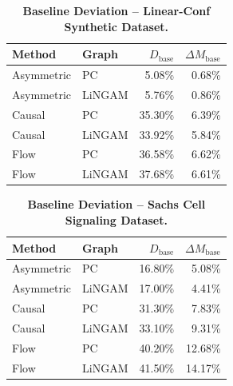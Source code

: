 \documentclass[12pt,a4paper,oneside]{article}
\begin{document}
\begin{table}[H]
  \centering
  \caption{\textbf{Baseline Deviation -- Linear-Conf Synthetic Dataset.}}
  \label{tab:baseline_synth}
  \begin{tabular}{llrr}
    \toprule
    \textbf{Method} & \textbf{Graph} & $D_{\text{base}}$ & $\Delta M_{\text{base}}$ \\
    \midrule
    Asymmetric & PC     & 5.08\%  & 0.68\% \\
    Asymmetric & LiNGAM & 5.76\%  & 0.86\% \\
    Causal     & PC     & 35.30\% & 6.39\% \\
    Causal     & LiNGAM & 33.92\% & 5.84\% \\
    Flow       & PC     & 36.58\% & 6.62\% \\
    Flow       & LiNGAM & 37.68\% & 6.61\% \\
    \bottomrule
  \end{tabular}
\end{table}

\begin{table}[H]
  \centering
  \caption{\textbf{Baseline Deviation -- Sachs Cell Signaling Dataset.}}
  \label{tab:baseline_sachs}
  \begin{tabular}{llrr}
    \toprule
    \textbf{Method} & \textbf{Graph} & $D_{\text{base}}$ & $\Delta M_{\text{base}}$ \\
    \midrule
    Asymmetric & PC     & 16.80\% & 5.08\%  \\
    Asymmetric & LiNGAM & 17.00\% & 4.41\%  \\
    Causal     & PC     & 31.30\% & 7.83\%  \\
    Causal     & LiNGAM & 33.10\% & 9.31\%  \\
    Flow       & PC     & 40.20\% & 12.68\% \\
    Flow       & LiNGAM & 41.50\% & 14.17\% \\
    \bottomrule
  \end{tabular}
\end{table}
\end{document}
